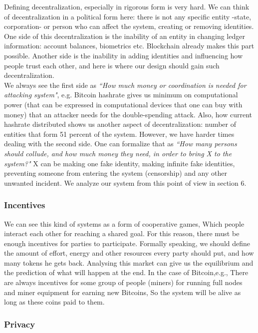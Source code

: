 \documentclass[conference]{IEEEtran}
\begin{document}
Defining decentralization, especially in rigorous form is very hard. We can think of decentralization in a political form here: there is not any specific entity -state, corporation- or person who can affect the system, creating or removing identities. One side of this decentralization is the inability of an entity in changing ledger information: account balances, biometrics etc. Blockchain already makes this part possible. Another side is the inability in adding identities and influencing how people trust each other, and here is where our design should gain such decentralization.
\\
We always see the first side as \textit{``How much money or coordination is needed for attacking system"}, e.g. Bitcoin hashrate gives us minimum on computational power (that can be expressed in computational devices that one can buy with money) that an attacker needs for the double-spending attack. Also, how current hashrate distributed shows us another aspect of decentralization: number of entities that form 51 percent of the system. However, we have harder times dealing with the second side. One can formalize that as \textit{``How many persons should collude, and how much money they need, in order to bring X to the system?"} X can be making one fake identity, making infinite fake identities, preventing someone from entering the system (censorship) and any other unwanted incident. We analyze our system from this point of view in section 6. 


\subsubsection{Incentives}
We can see this kind of systems as a form of cooperative games, Which people interact each other for reaching a shared goal. For this reason, there must be enough incentives for parties to participate. Formally speaking, we should define the amount of effort, energy and other resources every party should put, and how many tokens he gets back. Analysing this market can give us the equilibrium and the prediction of what will happen at the end. In the case of Bitcoin,e.g., There are always incentives for some group of people (miners) for running full nodes and miner equipment for earning new Bitcoins, So the system will be alive as long as these coins paid to them.


\subsubsection{Privacy}
\end{document}
